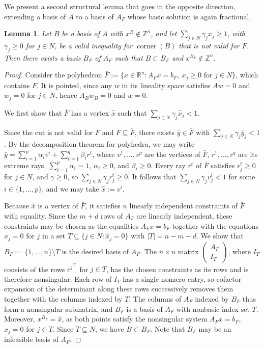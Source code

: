 \documentclass{article}
\newtheorem{lemma}{Lemma}
\newcommand{\Z}{\mathbb{Z}}
\newcommand{\R}{\mathbb{R}}
\begin{document}
We present a second structural lemma that goes in the opposite direction, extending a basis of $A$ to a basis of $A_F$ whose basic solution is again fractional.

\begin{lemma} \label{lemma:basis-extension}
    Let $B$ be a basis of $A$ with $x^B \notin \Z^n$, and let $\sum_{j \in N} \gamma_j x_j \geq 1$, with $\gamma_j \geq 0$ for $j \in N$, be a valid inequality for $\operatorname{corner}(B)$ that is not valid for $F$. Then there exists a basis $B_F$ of $A_F$ such that $B \subset B_F$ and $x^{B_F} \notin \Z^n$.
\end{lemma}

\begin{proof}
    Consider the polyhedron $\bar F := \{x \in \R^n: A_Fx=b_F, \ x_j \geq 0 \text{ for } j \in N\}$, which contains $F$. It is pointed, since any $w$ in its lineality space satisfies $Aw = 0$ and $w_j = 0$ for $j \in N$, hence $A_B w_B = 0$ and $w = 0$.

    We first show that $\bar F$ has a vertex $\hat x$ such that $\sum_{j \in N} \gamma_j \hat x_j < 1$.    
     
    Since the cut is not valid for $F$ and $F \subseteq \bar F$, there exists $\bar y \in \bar F$ with $\sum_{j \in N} \gamma_j \bar y_j < 1$. By the decomposition theorem for polyhedra, we may write $\bar y = \sum_{i=1}^{p} \alpha_i v^i + \sum_{t=1}^{q} \beta_t r^t$, where $v^1,\ldots,v^p$ are the vertices of $\bar F$, $r^1,\ldots,r^q$ are its extreme rays, $\sum_{i=1}^{p} \alpha_i = 1$, $\alpha_i \geq 0$, and $\beta_t \geq 0$. Every ray $r^t$ of $\bar F$ satisfies $r^t_j \geq 0$ for $j \in N$, and $\gamma \geq 0$, so $\sum_{j \in N} \gamma_j r^t_j \geq 0$. It follows that $\sum_{j \in N} \gamma_j v^i_j < 1$ for some $i \in \{1,\ldots,p\}$, and we may take $\hat x := v^i$.

    Because $\hat x$ is a vertex of $\bar F$, it satisfies $n$ linearly independent constraints of $\bar F$ with equality. Since the $m+d$ rows of $A_F$ are linearly independent, these constraints may be chosen as the equalities $A_F x = b_F$ together with the equations $x_j = 0$ for $j$ in a set $T \subseteq \{j \in N : \hat x_j = 0\}$ with $|T| = n-m-d$. We show that $B_F := \{1,\ldots,n\} \setminus T$ is the desired basis of $A_F$. The $n \times n$ matrix $\begin{pmatrix} A_F \\ I_T \end{pmatrix}$, where $I_T$ consists of the rows ${e^j}^\top$ for $j \in T$, has the chosen constraints as its rows and is therefore nonsingular. Each row of $I_T$ has a single nonzero entry, so cofactor expansion of the determinant along these rows successively removes them together with the columns indexed by $T$. The columns of $A_F$ indexed by $B_F$ thus form a nonsingular submatrix, and $B_F$ is a basis of $A_F$ with nonbasic index set $T$. Moreover, $x^{B_F} = \hat x$, as both points satisfy the nonsingular system $A_F x = b_F$, $x_j = 0$ for $j \in T$. Since $T \subseteq N$, we have $B \subset B_F$. Note that $B_F$ may be an infeasible basis of $A_F$.


\end{proof}
\end{document}
